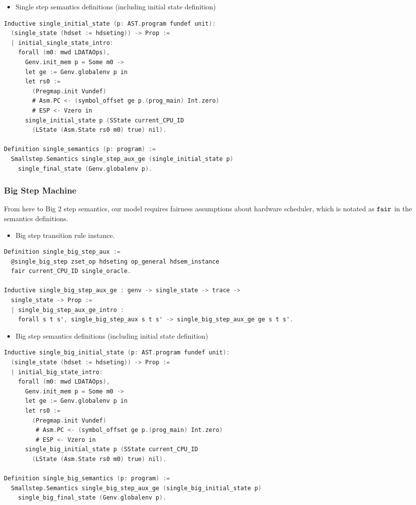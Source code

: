 \begin{itemize}[leftmargin=*]
\item Single step semantics definitions (including initial state definition)
\end{itemize}
\begin{lstlisting}[language=C]
Inductive single_initial_state (p: AST.program fundef unit): 
  (single_state (hdset := hdseting)) -> Prop :=
  | initial_single_state_intro: 
    forall (m0: mwd LDATAOps),
      Genv.init_mem p = Some m0 ->
      let ge := Genv.globalenv p in
      let rs0 :=
        (Pregmap.init Vundef)
        # Asm.PC <- (symbol_offset ge p.(prog_main) Int.zero)
        # ESP <- Vzero in
      single_initial_state p (SState current_CPU_ID 
        (LState (Asm.State rs0 m0) true) nil).

Definition single_semantics (p: program) :=
  Smallstep.Semantics single_step_aux_ge (single_initial_state p) 
    single_final_state (Genv.globalenv p).
\end{lstlisting}

\subsubsection{Big Step Machine}
From here to Big 2 step semantics,
our model requires fairness assumptions about hardware scheduler, which is notated as ${\mathrm{\texttt{fair}}}$ in the semantics definitions.
\begin{itemize}[leftmargin=*]
\item Big step transition rule instance.
\end{itemize}
\begin{lstlisting}[language=C]
Definition single_big_step_aux :=
  @single_big_step zset_op hdseting op_general hdsem_instance 
  fair current_CPU_ID single_oracle.

Inductive single_big_step_aux_ge : genv -> single_state -> trace -> 
  single_state -> Prop :=
  | single_big_step_aux_ge_intro : 
    forall s t s', single_big_step_aux s t s' -> single_big_step_aux_ge ge s t s'.
\end{lstlisting}


\begin{itemize}[leftmargin=*]
\item Big step semantics definitions (including initial state definition)
\end{itemize}
\begin{lstlisting}[language=C]
Inductive single_big_initial_state (p: AST.program fundef unit): 
  (single_state (hdset := hdseting)) -> Prop :=
  | initial_big_state_intro: 
    forall (m0: mwd LDATAOps),
      Genv.init_mem p = Some m0 ->
      let ge := Genv.globalenv p in
      let rs0 :=
        (Pregmap.init Vundef)
         # Asm.PC <- (symbol_offset ge p.(prog_main) Int.zero)
         # ESP <- Vzero in
      single_big_initial_state p (SState current_CPU_ID 
        (LState (Asm.State rs0 m0) true) nil).
      
Definition single_big_semantics (p: program) :=
  Smallstep.Semantics single_big_step_aux_ge (single_big_initial_state p) 
    single_big_final_state (Genv.globalenv p).
\end{lstlisting}

